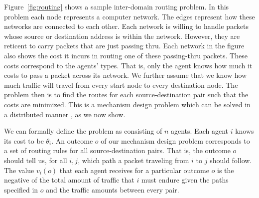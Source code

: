 \begin{SCfigure}
  \begin{minipage}{1.0\linewidth}
    \begin{center}
    \end{center}
  \end{minipage}
  \caption{Example Inter-domain routing problem. The nodes represent
    networks. Each one shows the cost it would incur in transporting a
    packet through its network. The agents' types are their costs.}
  \label{fig:routing}
\end{SCfigure}

\medskip

Figure~\ref{fig:routing} shows a sample inter-domain routing problem.
In this problem each node represents a computer network. The edges
represent how these networks are connected to each other. Each network
is willing to handle packets whose source or destination address is
within the network. However, they are reticent to carry packets that
are just passing thru. Each network in the figure also shows the cost
it incurs in routing one of these passing-thru packets. These costs
correspond to the agents' types. That is, only the agent knows how
much it costs to pass a packet across its network. We further assume
that we know how much traffic will travel from every start node to
every destination node. The problem then is to find the routes for
each source-destination pair such that the costs are minimized. This
is a mechanism design problem which can be solved in a distributed
manner \cite{feigenbaum05a}, as we now show.

We can formally define the problem as consisting of $n$ agents. Each
agent $i$ knows its cost to be $\theta_i$. An outcome $o$ of our
mechanism design problem corresponds to a set of routing rules for all
source-destination pairs. That is, the outcome $o$ should tell us, for
all $i,j$, which path a packet traveling from $i$ to $j$ should
follow. The value $v_i(o)$ that each agent receives for a particular
outcome $o$ is the negative of the total amount of traffic that $i$
must endure given the paths specified in $o$ and the traffic amounts
between every pair.

